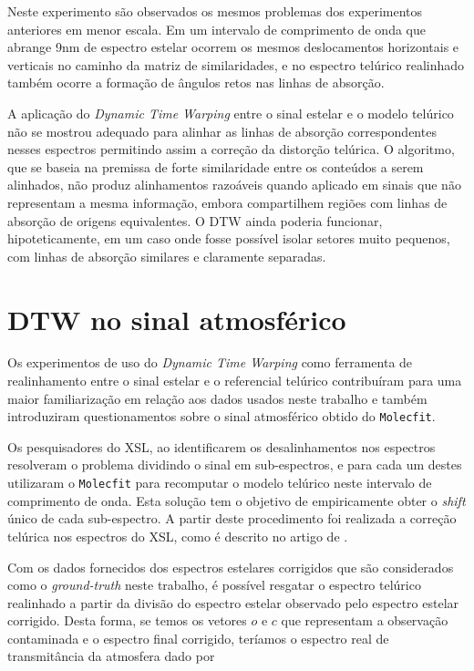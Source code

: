 Neste experimento são observados os mesmos problemas dos experimentos anteriores em menor escala. Em um intervalo de comprimento de onda que abrange 9nm de espectro estelar ocorrem os mesmos deslocamentos horizontais e verticais no caminho da matriz de similaridades, e no espectro telúrico realinhado também ocorre a formação de ângulos retos nas linhas de absorção.

A aplicação do \textit{Dynamic Time Warping} entre o sinal estelar e o modelo telúrico não se mostrou adequado para alinhar as linhas de absorção correspondentes nesses espectros permitindo assim a correção da distorção telúrica. O algoritmo, que se baseia na premissa de forte similaridade entre os conteúdos a serem alinhados, não produz alinhamentos razoáveis quando aplicado em sinais que não representam a mesma informação, embora compartilhem regiões com linhas de absorção de origens equivalentes. O DTW ainda poderia funcionar, hipoteticamente, em um caso onde fosse possível isolar setores muito pequenos, com linhas de absorção similares e claramente separadas.


\section{DTW no sinal atmosférico}

Os experimentos de uso do \textit{Dynamic Time Warping} como ferramenta de realinhamento entre o sinal estelar e o referencial telúrico contribuíram para uma maior familiarização em relação aos dados usados neste trabalho e também introduziram questionamentos sobre o sinal atmosférico obtido do \texttt{Molecfit}.

Os pesquisadores do XSL, ao identificarem os desalinhamentos nos espectros resolveram o problema dividindo o sinal em sub-espectros, e para cada um destes utilizaram o \texttt{Molecfit} para recomputar o modelo telúrico neste intervalo de comprimento de onda. Esta solução tem o objetivo de empiricamente obter o \textit{shift} único de cada sub-espectro. A partir deste procedimento foi realizada a correção telúrica nos espectros do XSL, como é descrito no artigo de \citet{unpublished-xshooter-data-release}.

Com os dados fornecidos dos espectros estelares corrigidos que são considerados como o \textit{ground-truth} neste trabalho, é possível resgatar o espectro telúrico realinhado a partir da divisão do espectro estelar observado pelo espectro estelar corrigido. Desta forma, se temos os vetores $o$ e $c$ que representam a observação contaminada e o espectro final corrigido, teríamos o espectro real de transmitância da atmosfera dado por


